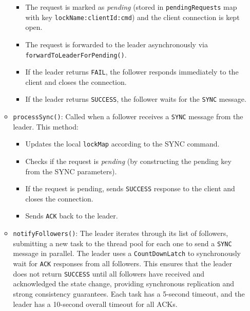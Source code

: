 \documentclass[a4paper,11pt]{article}
\begin{document}
\begin{itemize}
\begin{itemize}
                \begin{itemize}
                    \item The request is marked as \emph{pending} (stored in \texttt{pendingRequests} map with key \texttt{lockName:clientId:cmd}) and the client connection is kept open.
                    \item The request is forwarded to the leader asynchronously via \texttt{forwardToLeaderForPending()}.
                    \item If the leader returns \texttt{FAIL}, the follower responds immediately to the client and closes the connection.
                    \item If the leader returns \texttt{SUCCESS}, the follower waits for the \texttt{SYNC} message.
                \end{itemize}
            \item \texttt{processSync()}: Called when a follower receives a \texttt{SYNC} message from the leader. This method:
                \begin{itemize}
                    \item Updates the local \texttt{lockMap} according to the SYNC command.
                    \item Checks if the request is \emph{pending} (by constructing the pending key from the SYNC parameters).
                    \item If the request is pending, sends \texttt{SUCCESS} response to the client and closes the connection.
                    \item Sends \texttt{ACK} back to the leader.
                \end{itemize}
            \item \texttt{notifyFollowers()}: The leader iterates through its list of followers, submitting a new task to the thread pool for each one to send a \texttt{SYNC} message in parallel. The leader uses a \texttt{CountDownLatch} to synchronously wait for \texttt{ACK} responses from all followers. This ensures that the leader does not return \texttt{SUCCESS} until all followers have received and acknowledged the state change, providing synchronous replication and strong consistency guarantees. Each task has a 5-second timeout, and the leader has a 10-second overall timeout for all ACKs.
        \end{itemize}
\end{itemize}
\end{document}
